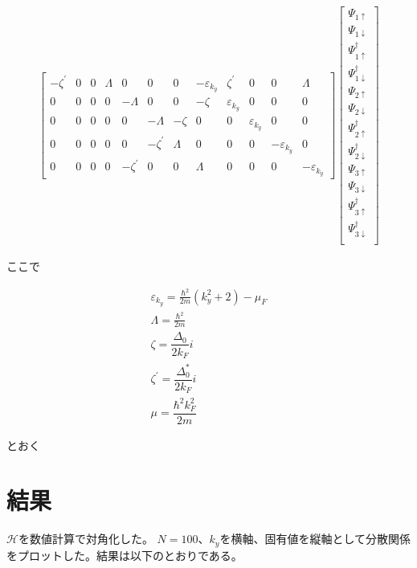 \documentclass{jsarticle}
\begin{document}
\begin{align}
\begin{bmatrix}
				-\zeta^{'} & 0 & 0 & \varLambda & 0 & 0 & 0 & -\varepsilon_{k_y} & \zeta^{'} & 0 & 0 & \varLambda \\
				0 & 0 & 0 & 0 & -\varLambda & 0 & 0 & -\zeta & \varepsilon_{k_y} & 0 & 0 & 0 \\
				0 & 0 & 0 & 0 & 0 & -\varLambda & -\zeta & 0 & 0 & \varepsilon_{k_y} & 0 & 0 \\
				0 & 0 & 0 & 0 & 0 & -\zeta^{'} & \varLambda & 0 & 0 & 0 & -\varepsilon_{k_y} & 0 \\
				0 & 0 & 0 & 0 & -\zeta^{'} & 0 & 0 & \varLambda & 0 & 0 & 0 & -\varepsilon_{k_y}
			\end{bmatrix}
			\begin{bmatrix}
				\Psi_{1\uparrow} \\
				\Psi_{1\downarrow} \\
				\Psi_{1\uparrow}^\dagger \\
				\Psi_{1\downarrow}^\dagger \\
				\Psi_{2\uparrow} \\
				\Psi_{2\downarrow} \\
				\Psi_{2\uparrow}^\dagger \\
				\Psi_{2\downarrow}^\dagger \\
				\Psi_{3\uparrow} \\
				\Psi_{3\downarrow} \\
				\Psi_{3\uparrow}^\dagger \\
				\Psi_{3\downarrow}^\dagger \\
			\end{bmatrix}
		\end{align}

		ここで

		\begin{align}
			\varepsilon_{k_y}=\frac{\hbar^2}{2m}(k_y^2+2)-\mu_F \\
			\varLambda=\frac{\hbar^2}{2m}\\
			\zeta=\dfrac{\Delta_0}{2k_{F}}i\\
			\zeta^{'}=\dfrac{\Delta_0^{*}}{2k_{F}}i\\
			\mu=\dfrac{\hbar^{2}k_F^{2}}{2m}
		\end{align}

		とおく

		\section{結果}
		$\mathcal{H}$を数値計算で対角化した。
		$N=100$、$k_y$を横軸、固有値を縦軸として分散関係をプロットした。結果は以下のとおりである。
\end{document}
